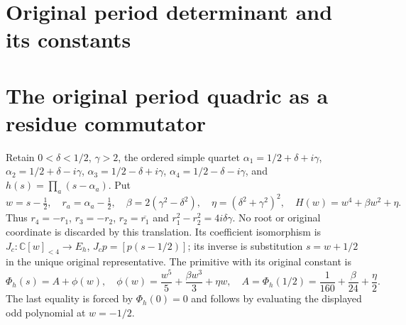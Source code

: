 \label{pcl:MPBUILD:RMR_PERIOD_RECEIVER:end}


\clearpage

\endgroup

\clearpage
\begingroup


\setcounter{equation}{0}
\renewcommand{\theequation}{RPC.\arabic{equation}}
\section*{Original period determinant and its constants}
\section{The original period quadric as a residue commutator}
\label{rpc:sec:actual-period-residue-commutator}

Retain $0<\delta<1/2$, $\gamma>2$, the ordered simple quartet
$\alpha_1=1/2+\delta+i\gamma$, $\alpha_2=1/2+\delta-i\gamma$,
$\alpha_3=1/2-\delta+i\gamma$, $\alpha_4=1/2-\delta-i\gamma$,
and $h(s)=\prod_a(s-\alpha_a)$. Put
\[
 w=s-\tfrac12,\quad r_a=\alpha_a-\tfrac12,\quad
 \beta=2(\gamma^2-\delta^2),\quad \eta=(\delta^2+\gamma^2)^2,
 \quad H(w)=w^4+\beta w^2+\eta.
 \tag{RPC1}
\]
Thus $r_4=-r_1$, $r_3=-r_2$, $r_2=\overline{r_1}$ and
$r_1^2-r_2^2=4i\delta\gamma$. No root or original coordinate is
discarded by this translation. Its coefficient isomorphism is
$J_c:\mathbb C[w]_{<4}\to E_h$, $J_cp=[p(s-1/2)]$; its inverse
is substitution $s=w+1/2$ in the unique original representative.
The primitive with its original constant is
\[
 \Phi_h(s)=A+\phi(w),\quad
 \phi(w)=\frac{w^5}{5}+\frac{\beta w^3}{3}+\eta w,\quad
 A=\Phi_h(1/2)=\frac1{160}+\frac\beta{24}+\frac\eta2.
 \tag{RPC2}
\]
The last equality is forced by $\Phi_h(0)=0$ and follows by evaluating
the displayed odd polynomial at $w=-1/2$.

